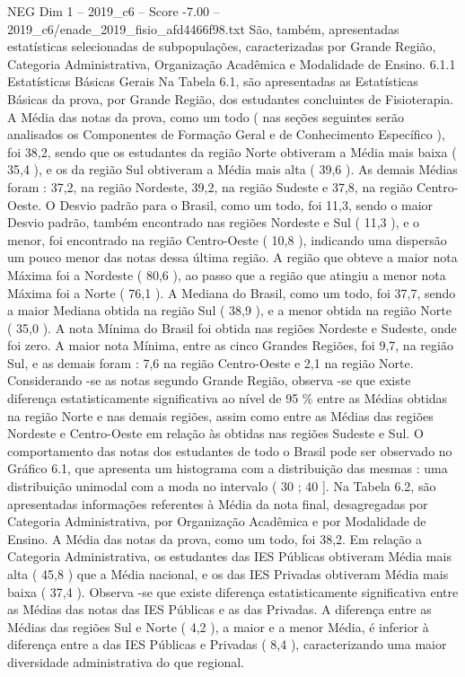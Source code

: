 \begin{textsample}{NEG Dim 1 – 2019\_c6 – Score -7.00 – 2019\_c6/enade\_2019\_fisio\_afd4466f98.txt}
São, também, apresentadas estatísticas selecionadas de subpopulações, caracterizadas por Grande Região, Categoria Administrativa, Organização Acadêmica e Modalidade de Ensino. 6.1.1 Estatísticas Básicas Gerais Na Tabela 6.1, são apresentadas as Estatísticas Básicas da prova, por Grande Região, dos estudantes concluintes de Fisioterapia.
A Média das notas da prova, como um todo ( nas seções seguintes serão analisados os Componentes de Formação Geral e de Conhecimento Específico ), foi 38,2, sendo que os estudantes da região Norte obtiveram a Média mais baixa ( 35,4 ), e os da região Sul obtiveram a Média mais alta ( 39,6 ).
As demais Médias foram : 37,2, na região Nordeste, 39,2, na região Sudeste e 37,8, na região Centro-Oeste.
O Desvio padrão para o Brasil, como um todo, foi 11,3, sendo o maior Desvio padrão, também encontrado nas regiões Nordeste e Sul ( 11,3 ), e o menor, foi encontrado na região Centro-Oeste ( 10,8 ), indicando uma dispersão um pouco menor das notas dessa última região.
A região que obteve a maior nota Máxima foi a Nordeste ( 80,6 ), ao passo que a região que atingiu a menor nota Máxima foi a Norte ( 76,1 ).
A Mediana do Brasil, como um todo, foi 37,7, sendo a maior Mediana obtida na região Sul ( 38,9 ), e a menor obtida na região Norte ( 35,0 ).
A nota Mínima do Brasil foi obtida nas regiões Nordeste e Sudeste, onde foi zero.
A maior nota Mínima, entre as cinco Grandes Regiões, foi 9,7, na região Sul, e as demais foram : 7,6 na região Centro-Oeste e 2,1 na região Norte.
Considerando -se as notas segundo Grande Região, observa -se que existe diferença estatisticamente significativa ao nível de 95 \% entre as Médias obtidas na região Norte e nas demais regiões, assim como entre as Médias das regiões Nordeste e Centro-Oeste em relação às obtidas nas regiões Sudeste e Sul.
O comportamento das notas dos estudantes de todo o Brasil pode ser observado no Gráfico 6.1, que apresenta um histograma com a distribuição das mesmas : uma distribuição unimodal com a moda no intervalo ( 30 ; 40 ].
Na Tabela 6.2, são apresentadas informações referentes à Média da nota final, desagregadas por Categoria Administrativa, por Organização Acadêmica e por Modalidade de Ensino.
A Média das notas da prova, como um todo, foi 38,2.
Em relação a Categoria Administrativa, os estudantes das IES Públicas obtiveram Média mais alta ( 45,8 ) que a Média nacional, e os das IES Privadas obtiveram Média mais baixa ( 37,4 ).
Observa -se que existe diferença estatisticamente significativa entre as Médias das notas das IES Públicas e as das Privadas.
A diferença entre as Médias das regiões Sul e Norte ( 4,2 ), a maior e a menor Média, é inferior à diferença entre a das IES Públicas e Privadas ( 8,4 ), caracterizando uma maior diversidade administrativa do que regional.

\end{textsample}

